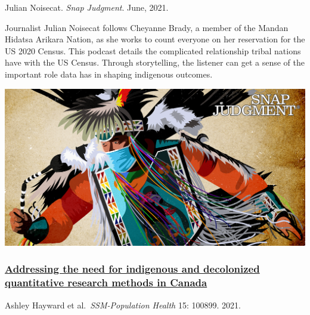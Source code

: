 \documentclass[
]{book}
\begin{document}
Julian Noisecat. \emph{Snap Judgment}. June, 2021.

Journalist Julian Noisecat follows Cheyanne Brady, a member of the Mandan Hidatsa Arikara Nation, as she works to count everyone on her reservation for the US 2020 Census. This podcast details the complicated relationship tribal nations have with the US Census. Through storytelling, the listener can get a sense of the important role data has in shaping indigenous outcomes.

\includegraphics[width=22.22in]{images/CensusPowwow}

\hypertarget{addressing-the-need-for-indigenous-and-decolonized-quantitative-research-methods-in-canada}{%
\subsubsection*{\texorpdfstring{\href{https://www.sciencedirect.com/science/article/pii/S2352827321001749}{Addressing the need for indigenous and decolonized quantitative research methods in Canada}}{Addressing the need for indigenous and decolonized quantitative research methods in Canada}}\label{addressing-the-need-for-indigenous-and-decolonized-quantitative-research-methods-in-canada}}

Ashley Hayward et al.~\emph{SSM-Population Health} 15: 100899. 2021.
\end{document}
